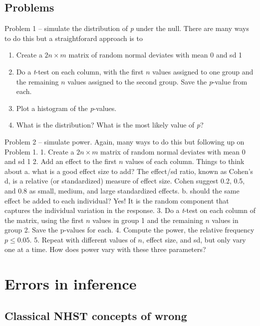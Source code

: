 \documentclass[]{book}
\providecommand{\tightlist}{%
  \setlength{\itemsep}{0pt}\setlength{\parskip}{0pt}}
\begin{document}
\hypertarget{problems}{%
\section{Problems}\label{problems}}

Problem 1 -- simulate the distribution of \emph{p} under the null. There are many ways to do this but a straightforard approach is to

\begin{enumerate}
\def\labelenumi{\arabic{enumi}.}
\tightlist
\item
  Create a \(2n \times m\) matrix of random normal deviates with mean 0 and sd 1
\item
  Do a \emph{t}-test on each column, with the first \(n\) values assigned to one group and the remaining \(n\) values assigned to the second group. Save the \emph{p}-value from each.
\item
  Plot a histogram of the \emph{p}-values.
\item
  What is the distribution? What is the most likely value of \emph{p}?
\end{enumerate}

Problem 2 -- simulate power. Again, many ways to do this but following up on Problem 1.
1. Create a \(2n \times m\) matrix of random normal deviates with mean 0 and sd 1
2. Add an effect to the first \(n\) values of each column. Things to think about
a. what is a good effect size to add? The effect/sd ratio, known as Cohen's d, is a relative (or standardized) measure of effect size. Cohen suggest 0.2, 0.5, and 0.8 as small, medium, and large standardized effects.
b. should the same effect be added to each individual? Yes! It is the random component that captures the individual variation in the response.
3. Do a \emph{t}-test on each column of the matrix, using the first \(n\) values in group 1 and the remaining \(n\) values in group 2. Save the p-values for each.
4. Compute the power, the relative frequency \(p \le 0.05\).
5. Repeat with different values of \(n\), effect size, and sd, but only vary one at a time. How does power vary with these three parameters?

\hypertarget{errors-in-inference}{%
\chapter{Errors in inference}\label{errors-in-inference}}

\hypertarget{classical-nhst-concepts-of-wrong}{%
\section{Classical NHST concepts of wrong}\label{classical-nhst-concepts-of-wrong}}
\end{document}
